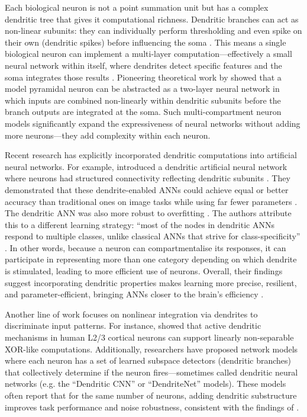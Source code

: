 Each biological neuron is not a point summation unit but has a complex dendritic tree that gives it computational richness.
Dendritic branches can act as non-linear subunits: they can individually perform thresholding and even spike on their own (dendritic spikes) before influencing the soma \citep{london2005dendriticComputation,poirazi2003two_layer}.
This means a single biological neuron can implement a multi-layer computation---effectively a small neural network within itself, where dendrites detect specific features and the soma integrates those results \citep{poirazi2003two_layer,london2005dendriticComputation}.
Pioneering theoretical work by \citet{poirazi2003two_layer} showed that a model pyramidal neuron can be abstracted as a two-layer neural network in which inputs are combined non-linearly within dendritic subunits before the branch outputs are integrated at the soma.
Such multi-compartment neuron models significantly expand the expressiveness of neural networks without adding more neurons---they add complexity within each neuron.

Recent research has explicitly incorporated dendritic computations into artificial neural networks.
For example, \citet{chavlis2025dendrites} introduced a dendritic artificial neural network where neurons had structured connectivity reflecting dendritic subunits \citep{chavlis2025dendrites}.
They demonstrated that these dendrite-enabled ANNs could achieve equal or better accuracy than traditional ones on image tasks while using far fewer parameters \citep{chavlis2025dendrites}.
The dendritic ANN was also more robust to overfitting \citep{chavlis2025dendrites}.
The authors attribute this to a different learning strategy: ``most of the nodes in dendritic ANNs respond to multiple classes, unlike classical ANNs that strive for class-specificity'' \citep{chavlis2025dendrites}.
In other words, because a neuron can compartmentalise its responses, it can participate in representing more than one category depending on which dendrite is stimulated, leading to more efficient use of neurons.
Overall, their findings suggest incorporating dendritic properties makes learning more precise, resilient, and parameter-efficient, bringing ANNs closer to the brain’s efficiency \citep{chavlis2025dendrites}.

Another line of work focuses on nonlinear integration via dendrites to discriminate input patterns.
For instance, \citet{gidon2020dendritic_ap} showed that active dendritic mechanisms in human L2/3 cortical neurons can support linearly non-separable XOR-like computations.
Additionally, researchers have proposed network models where each neuron has a set of learned subspace detectors (dendritic branches) that collectively determine if the neuron fires---sometimes called dendritic neural networks (e.g. the ``Dendritic CNN'' or ``DendriteNet'' models).
These models often report that for the same number of neurons, adding dendritic substructure improves task performance and noise robustness, consistent with the findings of \citet{chavlis2025dendrites}.

